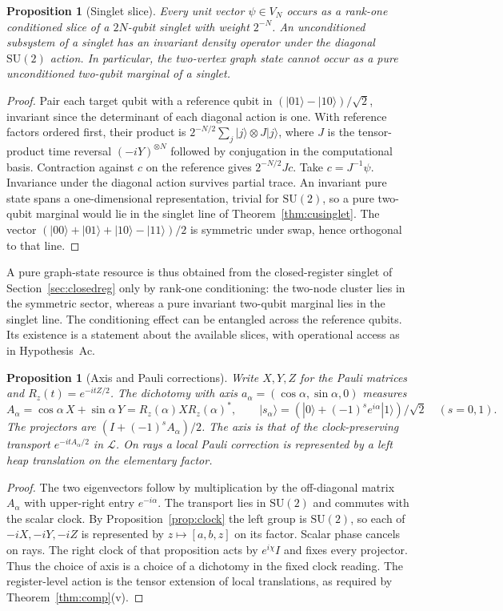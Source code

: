 \documentclass[aps,pra,onecolumn,superscriptaddress,nofootinbib,10pt]{revtex4-2}
\newtheorem{proposition}[theorem]{Proposition}
\theoremstyle{definition}
\theoremstyle{remark}
\newcommand{\SU}{\mathrm{SU}}
\begin{document}
\begin{proposition}[Singlet slice]\label{cp:slice}
Every unit vector $\psi\in V_N$ occurs as a rank-one conditioned slice of a $2N$-qubit singlet with weight $2^{-N}$. An unconditioned subsystem of a singlet has an invariant density operator under the diagonal $\SU(2)$ action. In particular, the two-vertex graph state cannot occur as a pure unconditioned two-qubit marginal of a singlet.
\end{proposition}
\begin{proof}
Pair each target qubit with a reference qubit in $(|01\rangle-|10\rangle)/\sqrt2$, invariant since the determinant of each diagonal action is one. With reference factors ordered first, their product is
$2^{-N/2}\sum_j |j\rangle\otimes J|j\rangle$, where $J$ is the tensor-product time reversal $(-iY)^{\otimes N}$ followed by conjugation in the computational basis. Contraction against $c$ on the reference gives $2^{-N/2}Jc$. Take $c=J^{-1}\psi$. Invariance under the diagonal action survives partial trace. An invariant pure state spans a one-dimensional representation, trivial for $\SU(2)$, so a pure two-qubit marginal would lie in the singlet line of Theorem~\ref{thm:cusinglet}. The vector $(|00\rangle+|01\rangle+|10\rangle-|11\rangle)/2$ is symmetric under swap, hence orthogonal to that line.
\end{proof}

A pure graph-state resource is thus obtained from the closed-register singlet of Section~\ref{sec:closedreg} only by
rank-one conditioning: the two-node cluster lies in the symmetric sector, whereas a pure invariant two-qubit
marginal lies in the singlet line.  The conditioning effect can be entangled across the reference qubits. Its existence is a statement about the available slices, with operational access as in Hypothesis~Ac.

\begin{proposition}[Axis and Pauli corrections]\label{cp:axis}
Write $X,Y,Z$ for the Pauli matrices and $R_z(t)=e^{-itZ/2}$. The dichotomy with axis $a_\alpha=(\cos\alpha,\sin\alpha,0)$ measures
\[
 A_\alpha=\cos\alpha\,X+\sin\alpha\,Y
 =R_z(\alpha)X R_z(\alpha)^*,\qquad
 |s_\alpha\rangle=(|0\rangle+(-1)^se^{i\alpha}|1\rangle)/\sqrt2
 \quad(s=0,1).
\]
The projectors are $(I+(-1)^sA_\alpha)/2$. The axis is that of the clock-preserving transport $e^{-itA_\alpha/2}$ in $\mathcal L$. On rays a local Pauli correction is represented by a left heap translation on the elementary factor.
\end{proposition}
\begin{proof}
The two eigenvectors follow by multiplication by the off-diagonal matrix $A_\alpha$ with upper-right entry $e^{-i\alpha}$. The transport lies in $\SU(2)$ and commutes with the scalar clock. By Proposition~\ref{prop:clock} the left group is $\SU(2)$, so each of $-iX,-iY,-iZ$ is represented by $z\mapsto[a,b,z]$ on its factor. Scalar phase cancels on rays. The right clock of that proposition acts by $e^{i\chi}I$ and fixes every projector. Thus the choice of axis is a choice of a dichotomy in the fixed clock reading. The register-level action is the tensor extension of local translations, as required by Theorem~\ref{thm:comp}(v).
\end{proof}
\end{document}
